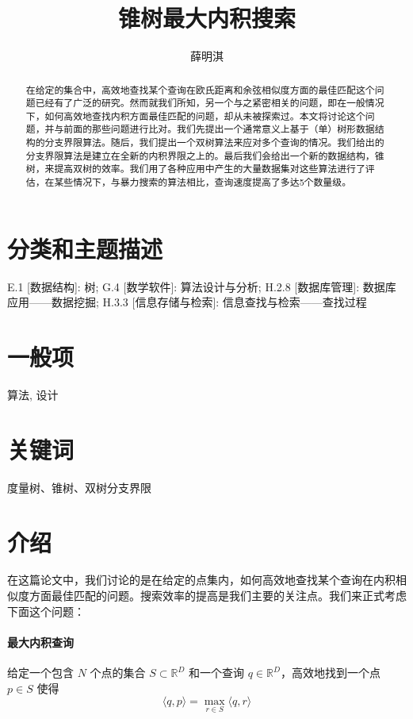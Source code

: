 \documentclass[twocolumn,a4paper]{article}
\begin{document}
\title{锥树最大内积搜索}
\author{薛明淇}
\maketitle

\begin{abstract}
在给定的集合中，高效地查找某个查询在欧氏距离和余弦相似度方面的最佳匹配这个问题已经有了广泛的研究。然而就我们所知，另一个与之紧密相关的问题，即在一般情况下，如何高效地查找内积方面最佳匹配的问题，却从未被探索过。本文将讨论这个问题，并与前面的那些问题进行比对。我们先提出一个通常意义上基于（单）树形数据结构的分支界限算法。随后，我们提出一个双树算法来应对多个查询的情况。我们给出的分支界限算法是建立在全新的内积界限之上的。最后我们会给出一个新的数据结构，锥树，来提高双树的效率。我们用了各种应用中产生的大量数据集对这些算法进行了评估，在某些情况下，与暴力搜索的算法相比，查询速度提高了多达5个数量级。
\end{abstract}

\section*{分类和主题描述}
E.1 [数据结构]: 树; G.4 [数学软件]: 算法设计与分析; H.2.8 [数据库管理]: 数据库应用——数据挖掘; H.3.3 [信息存储与检索]: 信息查找与检索——查找过程
\section*{一般项}
算法, 设计
\section*{关键词}
度量树、锥树、双树分支界限

\section{介绍}
在这篇论文中，我们讨论的是在给定的点集内，如何高效地查找某个查询在内积相似度方面最佳匹配的问题。搜索效率的提高是我们主要的关注点。我们来正式考虑下面这个问题：

\paragraph{最大内积查询} 给定一个包含 $N$ 个点的集合 $S \subset \mathbb{R}^D$ 和一个查询 $q \in \mathbb{R}^D$，高效地找到一个点 $p \in S$ 使得
\begin{equation}
\langle q,p \rangle = \max_{r \in S}\langle q,r \rangle
\end{equation}
\end{document}
